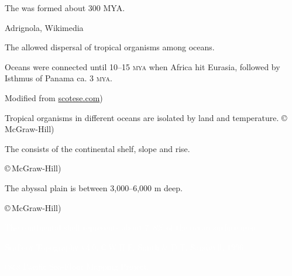 \documentclass[t]{beamer}
\begin{document}
%
{
\begin{frame}[b]{The  was formed about 300 MYA.}

	\hfill \tiny Adrignola, Wikimedia 

\end{frame}
}
%
{
\begin{frame}[b]{The  allowed dispersal of tropical organisms among oceans.}

	\hangpara Oceans were connected until 10–15 \textsc{mya} when Africa hit Eurasia, followed by Isthmus of Panama ca. 3 \textsc{mya}.

	\tiny \hfill Modified from \url{scotese.com})

\end{frame}
}
%
{
\begin{frame}[b]{Tropical organisms in different oceans are isolated by land and temperature.}
\tiny \copyright\,McGraw-Hill)
\end{frame}
}
%
{
\begin{frame}[b]{The  consists of the continental shelf, slope and rise.}

	\hfill \tiny \copyright\,McGraw-Hill)

\end{frame}
}
%
{
\begin{frame}[b]{The abyssal plain is between 3,000–6,000 m deep.}

	\hfill \tiny \copyright\,McGraw-Hill)

\end{frame}
}
%
{
\begin{frame}[b]{\textcolor{white}{The continental shelf represents about 7–8\% of the ocean surface area.}}

	\hfill \tiny \textcolor{white}{Seafloor Topography \textsc{v}4.0, \copyright\,W.H.F. Smith \& D.T. Sandwell, 1996.}

\end{frame}
}
%
{
\begin{frame}[b]{}
	\tiny	\textcolor{white}{\textsc{usgs} Pacific Sea-Floor Mapping Project.}
\end{frame}
}
%
\end{document}
